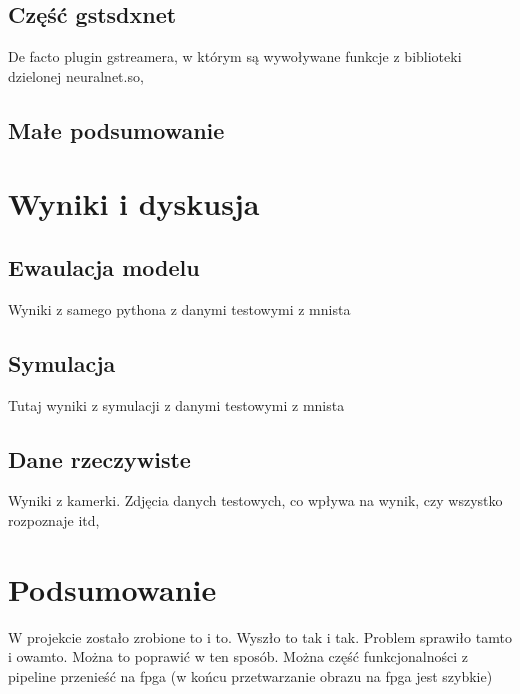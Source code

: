 \documentclass[12pt, oneside, a4paper]{article}
\begin{document}
\subsection{Część gstsdxnet}
De facto plugin gstreamera, w którym są wywoływane funkcje z biblioteki
dzielonej neuralnet.so, 

\subsection{Małe podsumowanie}


\newpage
\section{Wyniki i dyskusja}

\subsection{Ewaulacja modelu}
Wyniki z samego pythona z danymi testowymi z mnista

\subsection{Symulacja}
Tutaj wyniki z symulacji z danymi testowymi z mnista

\subsection{Dane rzeczywiste}
Wyniki z kamerki. Zdjęcia danych testowych, co wpływa na wynik, czy wszystko
rozpoznaje itd,

\newpage
\section{Podsumowanie}
W projekcie zostało zrobione to i to. Wyszło to tak i tak. Problem sprawiło
tamto i owamto. Można to poprawić w ten sposób. Można część funkcjonalności
z pipeline przenieść na fpga (w końcu przetwarzanie obrazu na fpga jest szybkie)
\end{document}
